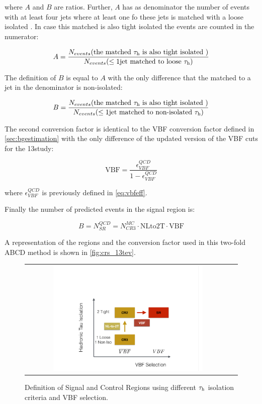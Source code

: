 where $A$ and $B$ are ratios. Further, $A$ has as denominator the number of events with at least four jets where at least one fo these jets is matched with a loose isolated \hadtau. In case this matched \hadtau is also tight isolated the events are counted in the numerator:

\begin{equation}
A = \dfrac{N_{events}(\text{the matched }\tau_{\text{h}}\text{ is also tight isolated })}{N_{events}(\leq 1\text{jet matched to loose }\tau_{\text{h}})}
\end{equation}

The definition of $B$ is equal to $A$ with the only difference that the \hadtau matched to a jet in the denominator is non-isolated:

\begin{equation}
B = \dfrac{N_{events}(\text{the matched }\tau_{\text{h}}\text{ is also tight isolated })}{N_{events}(\leq 1\text{jet matched to non-isolated }\tau_{\text{h}})}
\end{equation}

The second conversion factor is identical to the VBF conversion factor defined in \autoref{sec:bgestimation} with the only difference of the updated version of the VBF cuts for the 13\tev study:

\begin{equation}
\text{VBF} = \frac{\epsilon^{QCD}_{VBF}}{1 - \epsilon^{QCD}_{VBF}}
\end{equation}

where $\epsilon^{QCD}_{VBF}$ is previously defined in \autoref{eq:vbfeff}. 

Finally the number of predicted events in the signal region is:

\begin{equation}
B = N^{QCD}_{SR} = N^{MC}_{CR3}  \cdot \text{NLto2T} \cdot \text{VBF}
\label{eq::qcdbgpred_13tev}
\end{equation}

A representation of the regions and the conversion factor used in this two-fold ABCD method is shown in \autoref{fig:crs_13tev}.

\begin{figure}[tbh!]
	\centering
	\begin{tabular}{cc}
		\includegraphics[width=0.75\textwidth]{PLOTS/diTauHadLSotherPlots/controlregions13TeV.pdf}
	\end{tabular}
	\caption{Definition of Signal and Control Regions using different $\tau_{\text{h}}$ isolation criteria and VBF selection.}
	\label{fig:crs_13tev}
\end{figure}

